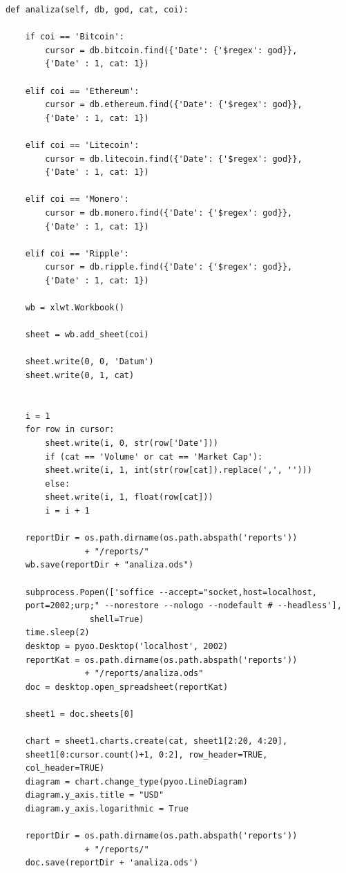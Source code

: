 \documentclass[a4paper,12pt]{foi}
\begin{document}
\lstset{commentstyle=\textit,language=python}
\begin{lstlisting}[frame=tb]
def analiza(self, db, god, cat, coi):

	if coi == 'Bitcoin':
	    cursor = db.bitcoin.find({'Date': {'$regex': god}}, 
	    {'Date' : 1, cat: 1})

	elif coi == 'Ethereum':
	    cursor = db.ethereum.find({'Date': {'$regex': god}}, 
	    {'Date' : 1, cat: 1})

	elif coi == 'Litecoin':
	    cursor = db.litecoin.find({'Date': {'$regex': god}}, 
	    {'Date' : 1, cat: 1})

	elif coi == 'Monero':
	    cursor = db.monero.find({'Date': {'$regex': god}}, 
	    {'Date' : 1, cat: 1})

	elif coi == 'Ripple':
	    cursor = db.ripple.find({'Date': {'$regex': god}}, 
	    {'Date' : 1, cat: 1})

	wb = xlwt.Workbook()

	sheet = wb.add_sheet(coi)

	sheet.write(0, 0, 'Datum')
	sheet.write(0, 1, cat)


	i = 1
	for row in cursor:
	    sheet.write(i, 0, str(row['Date']))
	    if (cat == 'Volume' or cat == 'Market Cap'):
		sheet.write(i, 1, int(str(row[cat]).replace(',', '')))
	    else:
		sheet.write(i, 1, float(row[cat]))
	    i = i + 1

	reportDir = os.path.dirname(os.path.abspath('reports')) 
				+ "/reports/"
	wb.save(reportDir + "analiza.ods")

	subprocess.Popen(['soffice --accept="socket,host=localhost,
	port=2002;urp;" --norestore --nologo --nodefault # --headless'],
		         shell=True)
	time.sleep(2)
	desktop = pyoo.Desktop('localhost', 2002)
	reportKat = os.path.dirname(os.path.abspath('reports')) 
				+ "/reports/analiza.ods"
	doc = desktop.open_spreadsheet(reportKat)

	sheet1 = doc.sheets[0]

	chart = sheet1.charts.create(cat, sheet1[2:20, 4:20], 
	sheet1[0:cursor.count()+1, 0:2], row_header=TRUE, 
	col_header=TRUE)
	diagram = chart.change_type(pyoo.LineDiagram)
	diagram.y_axis.title = "USD"
	diagram.y_axis.logarithmic = True

	reportDir = os.path.dirname(os.path.abspath('reports')) 
				+ "/reports/"
	doc.save(reportDir + 'analiza.ods')
\end{lstlisting}
\end{document}
